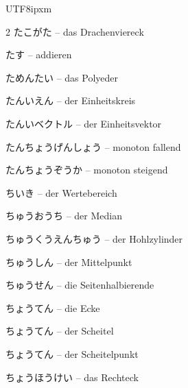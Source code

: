 \begin{CJK}{UTF8}{ipxm}
\begin{multicols}{2}
 {\footnotesize\color{black!70}たこがた} -- das Drachenviereck\dotfill\hyperref[e:203]{\pageref*{e:203}}\par
{} {\footnotesize\color{black!70}たす} -- addieren\dotfill\hyperref[e:14]{\pageref*{e:14}}\par
{} {\footnotesize\color{black!70}ためんたい} -- das Polyeder\dotfill\hyperref[e:233]{\pageref*{e:233}}\par
{} {\footnotesize\color{black!70}たんいえん} -- der Einheitskreis\dotfill\hyperref[e:137]{\pageref*{e:137}}\par
{} {\footnotesize\color{black!70}たんいベクトル} -- der Einheitsvektor\dotfill\hyperref[e:303]{\pageref*{e:303}}\par
{} {\footnotesize\color{black!70}たんちょうげんしょう} -- monoton fallend\dotfill\hyperref[e:143]{\pageref*{e:143}}\par
{} {\footnotesize\color{black!70}たんちょうぞうか} -- monoton steigend\dotfill\hyperref[e:142]{\pageref*{e:142}}\par
{} {\footnotesize\color{black!70}ちいき} -- der Wertebereich\dotfill\hyperref[e:110]{\pageref*{e:110}}\par
{} {\footnotesize\color{black!70}ちゅうおうち} -- der Median\dotfill\hyperref[e:339]{\pageref*{e:339}}\par
{} {\footnotesize\color{black!70}ちゅうくうえんちゅう} -- der Hohlzylinder\dotfill\hyperref[e:237]{\pageref*{e:237}}\par
{} {\footnotesize\color{black!70}ちゅうしん} -- der Mittelpunkt\dotfill\hyperref[e:212]{\pageref*{e:212}}\par
{} {\footnotesize\color{black!70}ちゅうせん} -- die Seitenhalbierende\dotfill\hyperref[e:192]{\pageref*{e:192}}\par
{} {\footnotesize\color{black!70}ちょうてん} -- die Ecke\dotfill\hyperref[e:245]{\pageref*{e:245}}\par
{} {\footnotesize\color{black!70}ちょうてん} -- der Scheitel\dotfill\hyperref[e:154]{\pageref*{e:154}}\par
{} {\footnotesize\color{black!70}ちょうてん} -- der Scheitelpunkt\dotfill\hyperref[e:129]{\pageref*{e:129}}\par
{} {\footnotesize\color{black!70}ちょうほうけい} -- das Rechteck\dotfill\hyperref[e:199]{\pageref*{e:199}}\par

\end{multicols}
\end{CJK}
